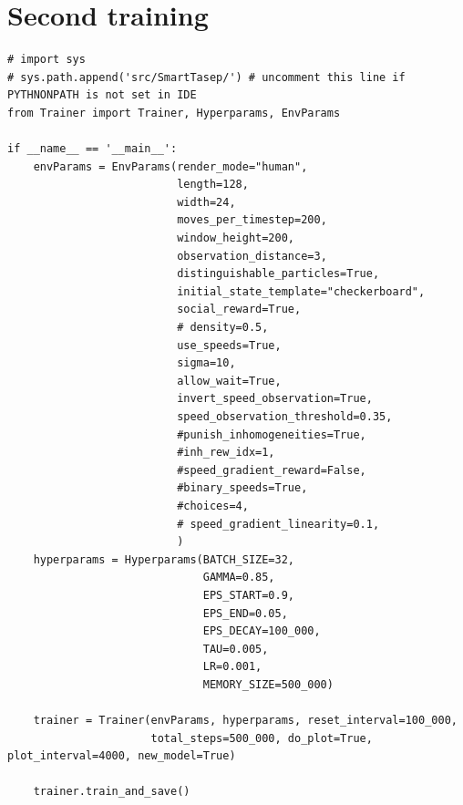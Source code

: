 \section{Second training}
\label{app:second_training}
\begin{verbatim}
# import sys
# sys.path.append('src/SmartTasep/') # uncomment this line if PYTHNONPATH is not set in IDE
from Trainer import Trainer, Hyperparams, EnvParams

if __name__ == '__main__':
    envParams = EnvParams(render_mode="human",
                          length=128,
                          width=24,
                          moves_per_timestep=200,
                          window_height=200,
                          observation_distance=3,
                          distinguishable_particles=True,
                          initial_state_template="checkerboard",
                          social_reward=True,
                          # density=0.5,
                          use_speeds=True,
                          sigma=10,
                          allow_wait=True,
                          invert_speed_observation=True,
                          speed_observation_threshold=0.35,
                          #punish_inhomogeneities=True,
                          #inh_rew_idx=1,
                          #speed_gradient_reward=False,
                          #binary_speeds=True,
                          #choices=4,
                          # speed_gradient_linearity=0.1,
                          )
    hyperparams = Hyperparams(BATCH_SIZE=32,
                              GAMMA=0.85,
                              EPS_START=0.9,
                              EPS_END=0.05,
                              EPS_DECAY=100_000,
                              TAU=0.005,
                              LR=0.001,
                              MEMORY_SIZE=500_000)

    trainer = Trainer(envParams, hyperparams, reset_interval=100_000,
                      total_steps=500_000, do_plot=True, plot_interval=4000, new_model=True)

    trainer.train_and_save()
\end{verbatim}

